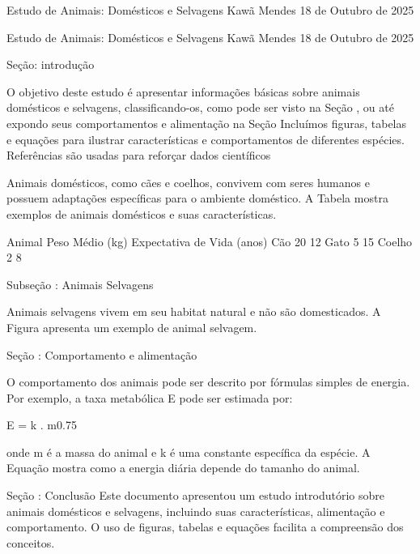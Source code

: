 \documentclass{article}
\begin{document}
Estudo de Animais: Domésticos e Selvagens
Kawã Mendes
18 de Outubro de 2025

Estudo de Animais: Domésticos e Selvagens
Kawã Mendes
18 de Outubro de 2025

Seção: introdução

O objetivo deste estudo é apresentar informações básicas sobre animais domésticos e selvagens, classificando-os, como pode ser visto na Seção %
, ou até expondo seus comportamentos e alimentação na Seção %
Incluímos figuras, tabelas e equações para ilustrar características e comportamentos de diferentes espécies.  
Referências são usadas para reforçar dados científicos %

Animais domésticos, como cães e coelhos, convivem com seres humanos e possuem adaptações específicas para o ambiente doméstico.  
A Tabela %
mostra exemplos de animais domésticos e suas características.

        Animal  Peso Médio (kg) Expectativa de Vida (anos)
        Cão  20  12 
        Gato  5  15 
        Coelho  2  8 

Subseção : Animais Selvagens

Animais selvagens vivem em seu habitat natural e não são domesticados.  
A Figura %
apresenta um exemplo de animal selvagem.


Seção : Comportamento e alimentação

O comportamento dos animais pode ser descrito por fórmulas simples de energia.  
Por exemplo, a taxa metabólica E pode ser estimada por:

    E = k . m{0.75}

onde m é a massa do animal e k é uma constante específica da espécie.  
A Equação %
mostra como a energia diária depende do tamanho do animal.

Seção : Conclusão
Este documento apresentou um estudo introdutório sobre animais domésticos e selvagens, incluindo suas características, alimentação e comportamento.  
O uso de figuras, tabelas e equações facilita a compreensão dos conceitos.
\end{document}
